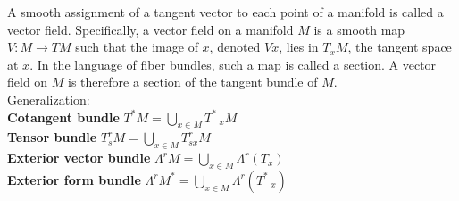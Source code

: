 \documentclass{article}
\begin{document}
A smooth assignment of a tangent vector to each point of a manifold is called a vector field. Specifically, a vector field on a manifold $M$ is a smooth map $V: M \to TM$ such that the image of $x$, denoted $Vx$, lies in $T_xM$, the tangent space at $x$. In the language of fiber bundles, such a map is called a section. A vector field on $M$ is therefore a section of the tangent bundle of $M$.\\
Generalization:\\
\textbf{Cotangent bundle} $T^*M = \bigcup_{x \in M} T^*_{\phantom{*}x}M$ \\
\textbf{Tensor bundle} $T^r_sM = \bigcup_{x \in M} T^{r\phantom{x}}_{sx}M$ \\
\textbf{Exterior vector bundle} $\Lambda^rM = \bigcup_{x \in M} \Lambda^r(T_x)$\\
\textbf{Exterior form bundle} $\Lambda^rM^* = \bigcup_{x \in M} \Lambda^r(T^{*}_{\phantom{*}x})$
\end{document}
